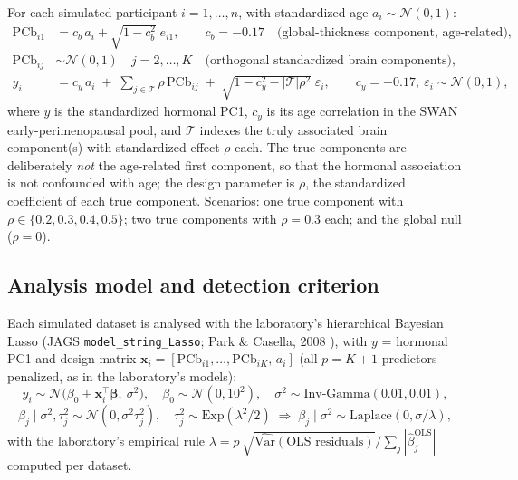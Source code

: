 \documentclass[11pt,a4paper]{article}
\begin{document}
For each simulated participant $i=1,\dots,n$, with standardized age $a_i\sim\mathcal{N}(0,1)$:
\begin{align}
\mathrm{PCb}_{i1} &= c_b\, a_i + \sqrt{1-c_b^{2}}\;e_{i1}, \qquad c_b=-0.17
\quad\text{(global-thickness component, age-related)},\nonumber\\
\mathrm{PCb}_{ij} &\sim \mathcal{N}(0,1) \quad j=2,\dots,K
\quad\text{(orthogonal standardized brain components)},\\[2pt]
y_i &= c_y\, a_i \;+\; \textstyle\sum_{j\in\mathcal{T}} \rho\,\mathrm{PCb}_{ij}
\;+\; \sqrt{1-c_y^{2}-|\mathcal{T}|\rho^{2}}\;\varepsilon_i,
\qquad c_y=+0.17,\ \varepsilon_i\sim\mathcal{N}(0,1),
\label{eq:genv3}
\end{align}
where $y$ is the standardized hormonal PC1, $c_y$ is its age correlation in the SWAN early-perimenopausal pool, and $\mathcal{T}$ indexes the truly associated brain component(s) with standardized effect $\rho$ each. The true components are deliberately \emph{not} the age-related first component, so that the hormonal association is not confounded with age; the design parameter is $\rho$, the standardized coefficient of each true component. Scenarios: one true component with $\rho\in\{0.2,0.3,0.4,0.5\}$; two true components with $\rho=0.3$ each; and the global null ($\rho=0$).

\subsection{Analysis model and detection criterion}

Each simulated dataset is analysed with the laboratory's hierarchical Bayesian Lasso (JAGS \texttt{model\_string\_Lasso}; Park \& Casella, 2008 \cite{park2008}), with $y$ = hormonal PC1 and design matrix $\mathbf{x}_i=[\mathrm{PCb}_{i1},\dots,\mathrm{PCb}_{iK},\,a_i]$ (all $p=K{+}1$ predictors penalized, as in the laboratory's models):
\begin{equation}
y_i \sim \mathcal{N}\!\bigl(\beta_0 + \mathbf{x}_i^{\top}\boldsymbol\beta,\ \sigma^2\bigr),\quad
\beta_0\sim\mathcal{N}(0,10^2),\quad \sigma^2\sim\text{Inv-Gamma}(0.01,0.01),
\end{equation}
\begin{equation}
\beta_j\mid\sigma^2,\tau_j^2 \sim \mathcal{N}(0,\sigma^2\tau_j^2),\quad
\tau_j^2\sim\text{Exp}(\lambda^2/2)
\;\Longrightarrow\; \beta_j\mid\sigma^2 \sim \text{Laplace}(0,\sigma/\lambda),
\end{equation}
with the laboratory's empirical rule $\lambda = p\,\sqrt{\widehat{\mathrm{Var}}(\text{OLS residuals})}\big/\sum_j|\hat\beta_j^{\mathrm{OLS}}|$ computed per dataset.
\end{document}
